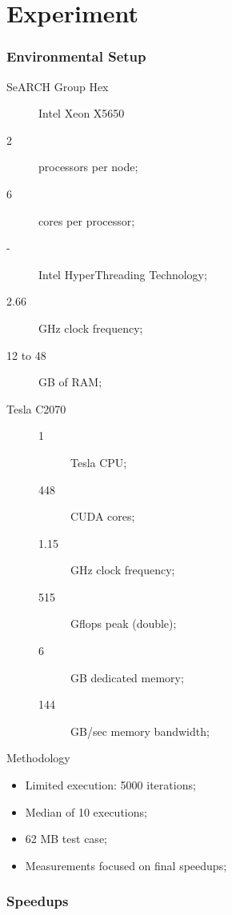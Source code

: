 \section{Experiment}


\begin{frame}
	\frametitle{Environmental Setup}

	\begin{block}{SeARCH Group Hex}
		\begin{description}
			\item [] Intel\textsuperscript{\textregistered} Xeon\textsuperscript{\textregistered} X5650
			\item [2] processors per node;
			\item [6] cores per processor;
			\item [-] Intel\textsuperscript{\textregistered} HyperThreading Technology;
			\item [2.66] GHz clock frequency;
			\item [12 to 48] GB of RAM;
			\item [Tesla C2070]
			\begin{description}
				\item [1] Tesla CPU;
				\item [448] CUDA cores;
				\item [1.15] GHz clock frequency;
				\item [515] Gflops peak (double);
				\item [6] GB dedicated memory;
				\item [144] GB/sec memory bandwidth;
			\end{description}
		\end{description}
	\end{block}
\end{frame}

\begin{frame}{Methodology}
	\begin{itemize}
		\vfill
		\item Limited execution: 5000 iterations;
		\vfill
		\item Median of 10 executions;
		\vfill
		\item 62 MB test case;
		\vfill
		\item Measurements focused on final speedups;
		\vfill
	\end{itemize}
\end{frame}

\begin{frame}
	\frametitle{Speedups}
\end{frame}
